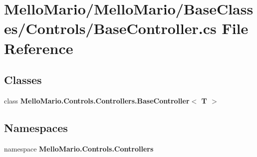\section{Mello\+Mario/\+Mello\+Mario/\+Base\+Classes/\+Controls/\+Base\+Controller.cs File Reference}
\label{BaseController_8cs}
\subsection*{Classes}
\begin{DoxyCompactItemize}
\item 
class \textbf{ Mello\+Mario.\+Controls.\+Controllers.\+Base\+Controller$<$ T $>$}
\end{DoxyCompactItemize}
\subsection*{Namespaces}
\begin{DoxyCompactItemize}
\item 
namespace \textbf{ Mello\+Mario.\+Controls.\+Controllers}
\end{DoxyCompactItemize}
